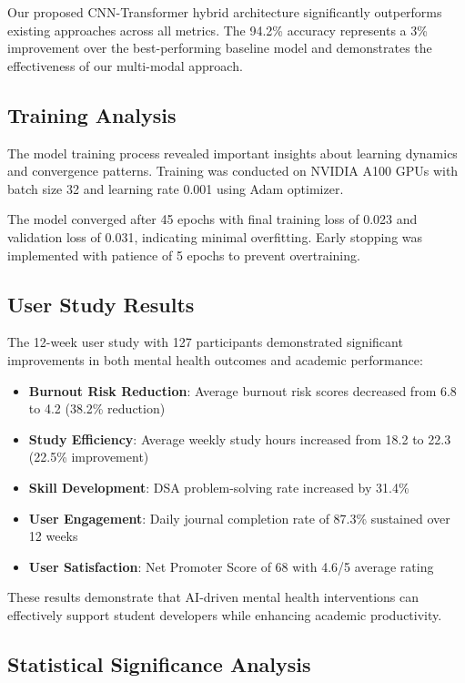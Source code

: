 \documentclass[conference,10pt]{IEEEtran}
\begin{document}
Our proposed CNN-Transformer hybrid architecture significantly outperforms existing approaches across all metrics. The 94.2\% accuracy represents a 3\% improvement over the best-performing baseline model and demonstrates the effectiveness of our multi-modal approach.

\subsection{Training Analysis}

The model training process revealed important insights about learning dynamics and convergence patterns. Training was conducted on NVIDIA A100 GPUs with batch size 32 and learning rate 0.001 using Adam optimizer.

The model converged after 45 epochs with final training loss of 0.023 and validation loss of 0.031, indicating minimal overfitting. Early stopping was implemented with patience of 5 epochs to prevent overtraining.

\subsection{User Study Results}

The 12-week user study with 127 participants demonstrated significant improvements in both mental health outcomes and academic performance:

\begin{itemize}
\item \textbf{Burnout Risk Reduction}: Average burnout risk scores decreased from 6.8 to 4.2 (38.2\% reduction)
\item \textbf{Study Efficiency}: Average weekly study hours increased from 18.2 to 22.3 (22.5\% improvement)
\item \textbf{Skill Development}: DSA problem-solving rate increased by 31.4\%
\item \textbf{User Engagement}: Daily journal completion rate of 87.3\% sustained over 12 weeks
\item \textbf{User Satisfaction}: Net Promoter Score of 68 with 4.6/5 average rating
\end{itemize}

These results demonstrate that AI-driven mental health interventions can effectively support student developers while enhancing academic productivity.

\subsection{Statistical Significance Analysis}
\end{document}

